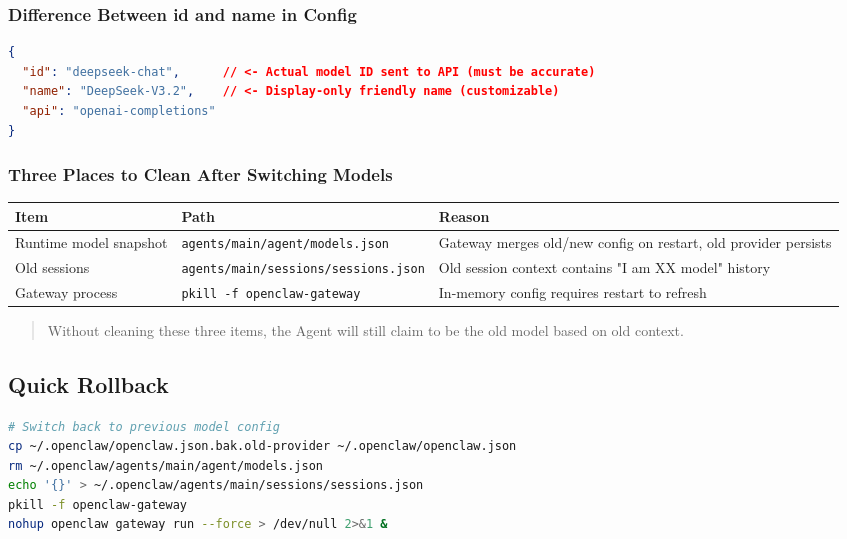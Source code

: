 \subsubsection{Difference Between id and name in Config}


\begin{lstlisting}[language=json]
{
  "id": "deepseek-chat",      // <- Actual model ID sent to API (must be accurate)
  "name": "DeepSeek-V3.2",    // <- Display-only friendly name (customizable)
  "api": "openai-completions"
}
\end{lstlisting}

\subsubsection{Three Places to Clean After Switching Models}


\begin{table}[h]
\centering
\small
\begin{tabular}{|l|l|l|}
\hline
Item & Path & Reason \\
\hline
Runtime model snapshot & \texttt{agents/main/agent/models.json} & Gateway merges old/new config on restart, old provider persists \\
\hline
Old sessions & \texttt{agents/main/sessions/sessions.json} & Old session context contains "I am XX model" history \\
\hline
Gateway process & \texttt{pkill -f openclaw-gateway} & In-memory config requires restart to refresh \\
\hline
\end{tabular}
\end{table}

\begin{quote}
Without cleaning these three items, the Agent will still claim to be the old model based on old context.
\end{quote}

\subsection{Quick Rollback}


\begin{lstlisting}[language=bash]
# Switch back to previous model config
cp ~/.openclaw/openclaw.json.bak.old-provider ~/.openclaw/openclaw.json
rm ~/.openclaw/agents/main/agent/models.json
echo '{}' > ~/.openclaw/agents/main/sessions/sessions.json
pkill -f openclaw-gateway
nohup openclaw gateway run --force > /dev/null 2>&1 &
\end{lstlisting}

